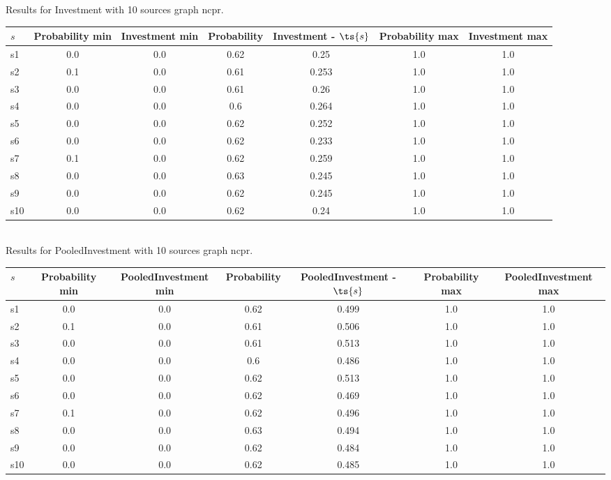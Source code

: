 \documentclass{article}
\begin{document}
\noindent Results for Investment with 10 sources graph ncpr.

\noindent\begin{tabular}{|l|c|c|c|c|c|c|}
\hline
$s$& Probability min & Investment min & Probability & Investment - $\ts{s}$ & Probability max & Investment max\\
\hline
s1 &0.0 & 0.0 & 0.62 & 0.25 & 1.0 & 1.0\\
\hline
s2 &0.1 & 0.0 & 0.61 & 0.253 & 1.0 & 1.0\\
\hline
s3 &0.0 & 0.0 & 0.61 & 0.26 & 1.0 & 1.0\\
\hline
s4 &0.0 & 0.0 & 0.6 & 0.264 & 1.0 & 1.0\\
\hline
s5 &0.0 & 0.0 & 0.62 & 0.252 & 1.0 & 1.0\\
\hline
s6 &0.0 & 0.0 & 0.62 & 0.233 & 1.0 & 1.0\\
\hline
s7 &0.1 & 0.0 & 0.62 & 0.259 & 1.0 & 1.0\\
\hline
s8 &0.0 & 0.0 & 0.63 & 0.245 & 1.0 & 1.0\\
\hline
s9 &0.0 & 0.0 & 0.62 & 0.245 & 1.0 & 1.0\\
\hline
s10 &0.0 & 0.0 & 0.62 & 0.24 & 1.0 & 1.0\\
\hline
\end{tabular}\\

\noindent Results for PooledInvestment with 10 sources graph ncpr.

\noindent\begin{tabular}{|l|c|c|c|c|c|c|}
\hline
$s$& Probability min & PooledInvestment min & Probability & PooledInvestment - $\ts{s}$ & Probability max & PooledInvestment max\\
\hline
s1 &0.0 & 0.0 & 0.62 & 0.499 & 1.0 & 1.0\\
\hline
s2 &0.1 & 0.0 & 0.61 & 0.506 & 1.0 & 1.0\\
\hline
s3 &0.0 & 0.0 & 0.61 & 0.513 & 1.0 & 1.0\\
\hline
s4 &0.0 & 0.0 & 0.6 & 0.486 & 1.0 & 1.0\\
\hline
s5 &0.0 & 0.0 & 0.62 & 0.513 & 1.0 & 1.0\\
\hline
s6 &0.0 & 0.0 & 0.62 & 0.469 & 1.0 & 1.0\\
\hline
s7 &0.1 & 0.0 & 0.62 & 0.496 & 1.0 & 1.0\\
\hline
s8 &0.0 & 0.0 & 0.63 & 0.494 & 1.0 & 1.0\\
\hline
s9 &0.0 & 0.0 & 0.62 & 0.484 & 1.0 & 1.0\\
\hline
s10 &0.0 & 0.0 & 0.62 & 0.485 & 1.0 & 1.0\\
\hline
\end{tabular}\\
\end{document}
